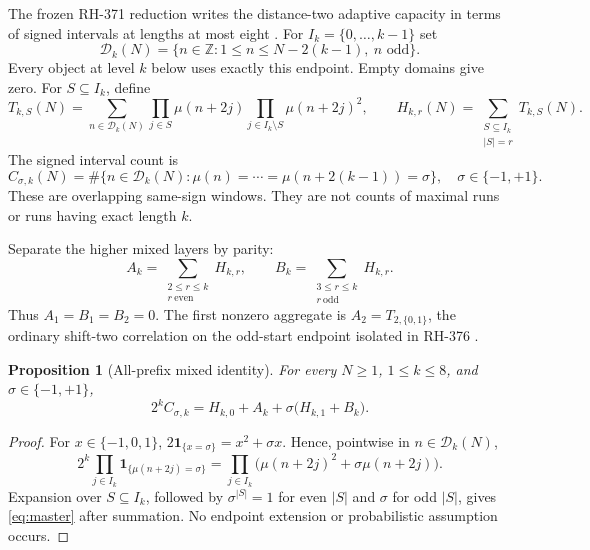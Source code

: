 \documentclass[11pt]{article}
\newtheorem{proposition}[theorem]{Proposition}
\theoremstyle{definition}
\theoremstyle{remark}
\newcommand{\Mob}{\mu}
\newcommand{\one}{\mathbf 1}
\begin{document}
The frozen RH-371 reduction writes the distance-two adaptive capacity in
terms of signed intervals at lengths at most eight \cite{RH371}.  For
$I_k=\{0,\ldots,k-1\}$ set
\begin{equation}
 \mathcal D_k(N)=
 \{n\in\mathbb Z:1\le n\le N-2(k-1),\ n\text{ odd}\}.
 \label{eq:domain}
\end{equation}
Every object at level $k$ below uses exactly this endpoint.  Empty domains
give zero.  For $S\subseteq I_k$, define
\begin{equation}
 T_{k,S}(N)=\sum_{n\in\mathcal D_k(N)}
 \prod_{j\in S}\Mob(n+2j)
 \prod_{j\in I_k\setminus S}\Mob(n+2j)^2,
 \qquad
 H_{k,r}(N)=\sum_{\substack{S\subseteq I_k\\|S|=r}}T_{k,S}(N).
 \label{eq:mixed-moments}
\end{equation}
The signed interval count is
\begin{equation}
 C_{\sigma,k}(N)=\#\{n\in\mathcal D_k(N):
       \Mob(n)=\cdots=\Mob(n+2(k-1))=\sigma\},
 \quad \sigma\in\{-1,+1\}.
 \label{eq:run-count}
\end{equation}
These are overlapping same-sign windows.  They are not counts of maximal
runs or runs having exact length $k$.

Separate the higher mixed layers by parity:
\begin{equation}
 A_k=\sum_{\substack{2\le r\le k\\r\ \mathrm{even}}}H_{k,r},
 \qquad
 B_k=\sum_{\substack{3\le r\le k\\r\ \mathrm{odd}}}H_{k,r}.
 \label{eq:AB}
\end{equation}
Thus $A_1=B_1=B_2=0$.  The first nonzero aggregate is
$A_2=T_{2,\{0,1\}}$, the ordinary shift-two correlation on the odd-start
endpoint isolated in RH-376 \cite{RH376}.

\begin{proposition}[All-prefix mixed identity]
For every $N\ge1$, $1\le k\le8$, and $\sigma\in\{-1,+1\}$,
\begin{equation}
 \boxed{\displaystyle
 2^kC_{\sigma,k}=H_{k,0}+A_k+
                  \sigma\bigl(H_{k,1}+B_k\bigr).}
 \label{eq:master}
\end{equation}
\end{proposition}

\begin{proof}
For $x\in\{-1,0,1\}$,
$2\one_{\{x=\sigma\}}=x^2+\sigma x$.  Hence, pointwise in
$n\in\mathcal D_k(N)$,
\[
 2^k\prod_{j\in I_k}\one_{\{\Mob(n+2j)=\sigma\}}
 =\prod_{j\in I_k}\bigl(\Mob(n+2j)^2+\sigma\Mob(n+2j)\bigr).
\]
Expansion over $S\subseteq I_k$, followed by $\sigma^{|S|}=1$ for even
$|S|$ and $\sigma$ for odd $|S|$, gives \eqref{eq:master} after summation.
No endpoint extension or probabilistic assumption occurs.
\end{proof}
\end{document}
